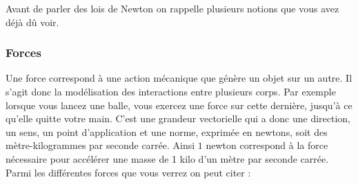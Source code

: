 \documentclass{article}
\begin{document}
Avant de parler des lois de Newton on rappelle plusieurs notions que vous avez déjà dû voir.

\subsubsection{Forces}

Une force correspond à une action mécanique que génère un objet sur un autre. Il s'agit donc la modélisation des interactions entre plusieurs corps. Par exemple lorsque vous lancez une balle, vous exercez une force sur cette dernière, jusqu'à ce qu'elle quitte votre main. C'est une grandeur vectorielle qui a donc une direction, un sens, un point d'application et une norme, exprimée en newtons,
soit des mètre-kilogrammes par seconde carrée. Ainsi $1$ newton correspond à la force nécessaire pour accélérer une masse de 1 kilo d'un mètre par seconde carrée. Parmi les différentes forces que vous verrez on peut citer :
\end{document}
